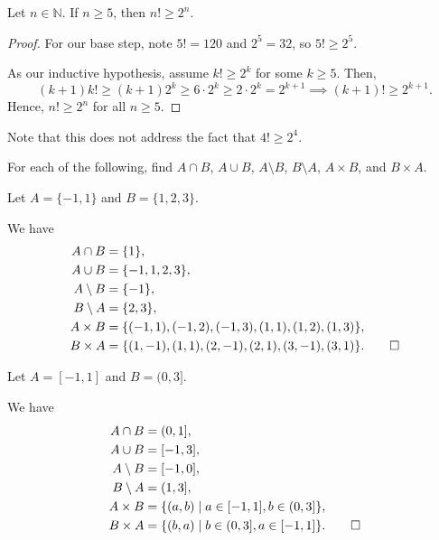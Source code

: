 \begin{claim}
Let $ n\in\mathbb{N} $. If $ n\geq 5 $, then $ n!\geq 2^n $.
\end{claim}
\begin{proof}
For our base step, note $ 5!=120 $ and $ 2^5=32 $, so $ 5!\geq 2^5 $.

As our inductive hypothesis, assume $ k!\geq 2^k $ for some $ k\geq 5 $. Then,
\begin{equation*}
    (k+1)k!\geq (k+1)2^k \geq 6\cdot 2^k \geq 2\cdot 2^k=2^{k+1} \implies (k+1)!\geq 2^{k+1}.
\end{equation*}
Hence, $ n!\geq 2^n $ for all $ n\geq 5 $.
\end{proof}

Note that this does not address the fact that $ 4!\geq 2^4$.


For each of the following, find $ A\cap B $, $ A\cup B $, $ A\setminus B $, $ B\setminus A $, $ A\times B $, and $ B\times A $.

\begin{exer}
Let $ A=\{-1,1\} $ and $ B=\{1,2,3\} $.
\end{exer}
\begin{sltn}
We have
\begin{align*}
    A\cap B &= \{1\}, \\
    A\cup B &= \{-1,1,2,3\}, \\
    A\setminus B &= \{-1\}, \\
    B\setminus A &= \{2,3\}, \\
    A\times B &= \{(-1,1),(-1,2),(-1,3),(1,1),(1,2),(1,3)\}, \\
    B\times A &= \{(1,-1),(1,1),(2,-1),(2,1),(3,-1),(3,1)\}.\qedhere
\end{align*}
\end{sltn}

\begin{exer}
Let $ A=[-1,1] $ and $ B=(0,3] $.
\end{exer}
\begin{sltn}
We have
\begin{align*}
    A\cap B &= (0,1], \\
    A\cup B &= [-1,3], \\
    A\setminus B &= [-1,0], \\
    B\setminus A &= (1,3], \\
    A\times B &= \{(a,b)\mid a\in[-1,1],b\in (0,3]\}, \\
    B\times A &= \{(b,a)\mid b\in (0,3],a\in [-1,1]\}.\qedhere
\end{align*}
\end{sltn}

